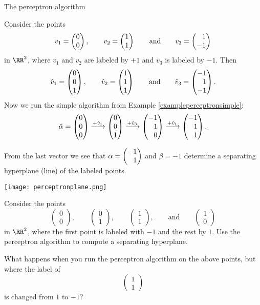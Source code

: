 \documentclass{article}
\newcommand{\vect}[2]{\begin{pmatrix} #1 \\ #2 \end{pmatrix}}
\newcommand{\vects}[3]{\begin{pmatrix} #1 \\ #2 \\ #3\end{pmatrix}}
\newcommand{\hphm}{\hphantom{-}}
\begin{document}
\begin{hideinbutton}{The perceptron algorithm}
\begin{example}\label{Examplepercep}
Consider the points
$$
v_1 = \vect{0}{0},\qquad v_2=\vect{1}{1}\qquad\text{and}\qquad v_3=\vect{\hphm 1}{-1}
$$
in $\RR^2$, where $v_1$ and $v_2$ are labeled by $+1$ and $v_3$ is labeled by $-1$. Then
$$
\hat{v}_1 = \vects{0}{0}{1},\qquad \hat{v}_2 = \vects{1}{1}{1}\qquad
\text{and}\qquad \hat{v}_3 = \vects{-1}{\hphm 1}{-1}.
$$
Now we run the simple algorithm from Example \ref{exampleperceptronsimple}:
$$
\hat{\alpha} = \vects{0}{0}{0}\xrightarrow{+\hat{v}_1} \vects{0}{0}{1} \xrightarrow{+\hat{v}_3} \vects{-1}{\hphm 1}{\hphm 0} \xrightarrow{+\hat{v}_1} \vects{-1}{\hphm 1}{\hphm 1}.
$$

From the last vector we see that $\alpha = \vect{-1}{\hphm 1}$ and $\beta = -1$ determine
a separating hyperplane (line) of the labeled points.

\texttt{[image: perceptronplane.png]}

\end{example}


\beginshex
Consider the points
$$
\begin{pmatrix}
0 \\ 0
\end{pmatrix},\qquad
\begin{pmatrix}
0 \\ 1
\end{pmatrix},\qquad

\begin{pmatrix}
1 \\ 1
\end{pmatrix},\qquad\text{and}\qquad
\begin{pmatrix}
1 \\ 0
\end{pmatrix}
$$
in $\RR^2$, where the first point is labeled with $-1$ and the rest by $1$.
Use the perceptron algorithm to compute a separating hyperplane.

What happens when you run the perceptron algorithm on the above
points, but where the label of
$$
\begin{pmatrix}
  1 \\ 1
\end{pmatrix}
$$
is changed from $1$ to $-1$?
\endshex



\end{hideinbutton}
\end{document}
